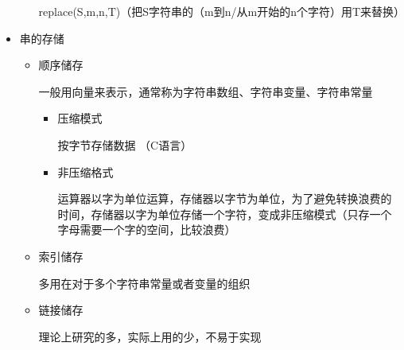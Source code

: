 \documentclass[AutoFakeBold]{LZUThesis2007}
\begin{document}
\begin{itemize}
\begin{itemize}
				replace(S,m,n,T)（把S字符串的（m到n/从m开始的n个字符）用T来替换）
			\end{itemize}
		\item 串的存储
			\begin{itemize}
				\item 顺序储存

				一般用向量来表示，通常称为字符串数组、字符串变量、字符串常量
					\begin{itemize}
						\item 压缩模式

						按字节存储数据 （C语言）

						\item 非压缩格式

						运算器以字为单位运算，存储器以字节为单位，为了避免转换浪费的时间，存储器以字为单位存储一个字符，变成非压缩模式（只存一个字母需要一个字的空间，比较浪费）
					\end{itemize}
				\item 索引储存

				多用在对于多个字符串常量或者变量的组织
				\item 链接储存

				理论上研究的多，实际上用的少，不易于实现
			\end{itemize}
	\end{itemize}
\end{document}
